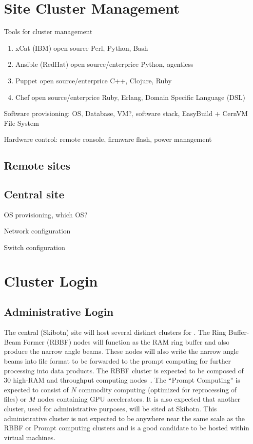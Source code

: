 \documentclass[12pt,a4paper]{article}
\begin{document}
\section{Site Cluster Management}

Tools for cluster management

\begin{enumerate}
    \item xCat (IBM) open source  Perl, Python, Bash
    \item Ansible (RedHat) open source/enterprice Python, agentless
    \item Puppet open source/enterprice  C++, Clojure, Ruby
    \item Chef open source/enterprice Ruby, Erlang, Domain Specific Language (DSL) 
\end{enumerate}

Software provisioning: OS, Database, VM?, software stack, EasyBuild + CernVM File System

Hardware control: remote console, firmware flash, power management

\subsection{Remote sites}

\subsection{Central site}

OS provisioning, which OS?

Network configuration

Switch configuration


\section{Cluster Login}
\label{sec:cluster}

\subsection{Administrative Login}
\label{sec:admin}


The central (Skibotn) site will host several distinct clusters for \ED.
The Ring Buffer-Beam Former (RBBF) nodes will function as the RAM ring buffer and also produce the narrow angle beams.
These nodes will also write the narrow angle beams into file format to be forwarded to the prompt computing for further processing into data products.
The RBBF cluster is expected to be composed of $30$ high-RAM and throughput computing nodes~\cite{amd-epyc}.
The ``Prompt Computing'' is expected to consist of $N$ commodity computing (optimized for reprocessing of files) or $M$ nodes containing
GPU accelerators.
It is also expected that another cluster, used for administrative purposes, will be sited at Skibotn.
This administrative cluster is not expected to be anywhere near the same scale as the RBBF or Prompt computing clusters
and is a good candidate to be hosted within virtual machines.
\end{document}
